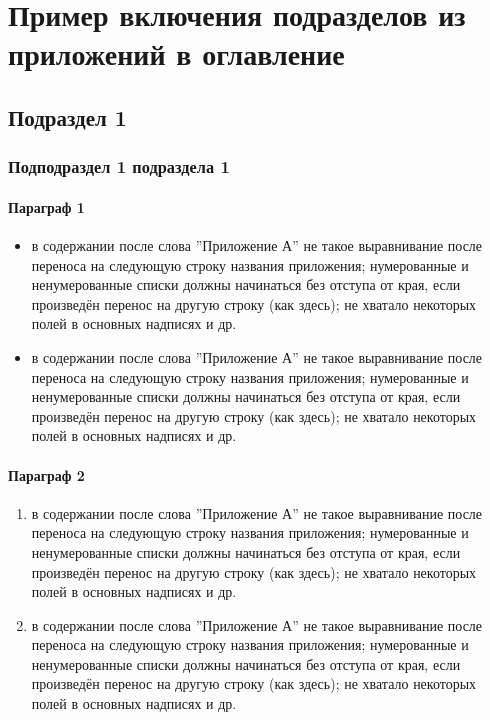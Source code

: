 \section{Пример включения подразделов из приложений в оглавление}

\subsection{Подраздел 1}

\subsubsection{Подподраздел 1 подраздела 1}

\paragraph{Параграф 1}
\begin{itemize}
  \item в содержании после слова ''Приложение А'' не такое выравнивание после переноса на следующую строку названия приложения; 
    \itemb нумерованные и ненумерованные списки должны начинаться без отступа от края, если произведён перенос на другую строку (как здесь);
    \itemb не хватало некоторых полей в основных надписях и др.
  \item в содержании после слова ''Приложение А'' не такое выравнивание после переноса на следующую строку названия приложения; 
    \itemb нумерованные и ненумерованные списки должны начинаться без отступа от края, если произведён перенос на другую строку (как здесь);
    \itemb не хватало некоторых полей в основных надписях и др.
\end{itemize}

\paragraph{Параграф 2}
\begin{enumerate}
  \item в содержании после слова ''Приложение А'' не такое выравнивание после переноса на следующую строку названия приложения; 
    \itemb нумерованные и ненумерованные списки должны начинаться без отступа от края, если произведён перенос на другую строку (как здесь);
    \itemb не хватало некоторых полей в основных надписях и др.
  \item в содержании после слова ''Приложение А'' не такое выравнивание после переноса на следующую строку названия приложения; 
    \itemb нумерованные и ненумерованные списки должны начинаться без отступа от края, если произведён перенос на другую строку (как здесь);
    \itemb не хватало некоторых полей в основных надписях и др.
\end{enumerate}



